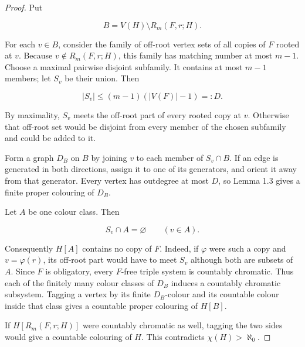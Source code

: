 \documentclass[a4paper,11pt,reqno]{amsart}
\theoremstyle{plain}
\theoremstyle{definition}
\theoremstyle{remark}
\begin{document}
\begin{proof}
Put

\[
B=V(H)\setminus R_m(F,r;H).
\]

For each \(v\in B\), consider the family of off-root vertex sets of all
copies of \(F\) rooted at \(v\). Because
\(v\notin R_m(F,r;H)\), this family has matching number at most \(m-1\).
Choose a maximal pairwise disjoint subfamily. It contains at most \(m-1\)
members; let \(S_v\) be their union. Then

\[
|S_v|\le(m-1)(|V(F)|-1)=:D.
\]

By maximality, \(S_v\) meets the off-root part of every rooted copy at \(v\).
Otherwise that off-root set would be disjoint from every member of the
chosen subfamily and could be added to it.

Form a graph \(D_B\) on \(B\) by joining \(v\) to each member of \(S_v\cap B\). If an edge is generated in both directions, assign it to one of its generators, and orient it away from that generator. Every vertex has outdegree at most \(D\), so Lemma 1.3 gives a finite proper colouring of \(D_B\).

Let \(A\) be one colour class. Then

\[
S_v\cap A=\varnothing\qquad(v\in A).
\]

Consequently \(H[A]\) contains no copy of \(F\). Indeed, if \(\varphi\) were such a copy and \(v=\varphi(r)\), its off-root part would have to meet \(S_v\) although both are subsets of \(A\). Since \(F\) is obligatory, every \(F\)-free triple system is countably chromatic. Thus each of the finitely many colour classes of \(D_B\) induces a countably chromatic subsystem. Tagging a vertex by its finite \(D_B\)-colour and its countable colour inside that class gives a countable proper colouring of \(H[B]\).

If \(H[R_m(F,r;H)]\) were countably chromatic as well, tagging the two sides would give a countable colouring of \(H\). This contradicts \(\chi(H)>\aleph_0\).
\end{proof}
\end{document}
